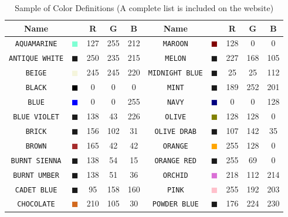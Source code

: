 \documentclass[11pt]{book}
\newcommand{\ct}{\tt\small}
\begin{document}
\begin{table}[p]
\begin{center}
\caption{Sample of Color Definitions (A complete list is included on the website) }
\label{tab:colors}
\vspace{0.1in}
\begin{tabular}{|c|c|c|c|c|c||c|c|c|c|}
\hline
Name & &  R  & G & B & Name & & R & G & B   \\ \hline \hline
{\ct AQUAMARINE} & \textcolor{AQUAMARINE} {$\blacksquare$} & 127& 255& 212& {\ct MAROON} &  \textcolor{MAROON} {$\blacksquare$} & 128& 0& 0  \\ \hline
{\ct ANTIQUE WHITE} & \textcolor{ANTIQUE WHITE} {$\blacksquare$} & 250& 235& 215& {\ct MELON} &  \textcolor{MELON} {$\blacksquare$} & 227& 168& 105  \\ \hline
{\ct BEIGE} & \textcolor{BEIGE} {$\blacksquare$} & 245& 245& 220& {\ct MIDNIGHT BLUE} &  \textcolor{MIDNIGHT BLUE} {$\blacksquare$} & 25& 25& 112  \\ \hline
{\ct BLACK} & \textcolor{BLACK} {$\blacksquare$} & 0& 0& 0& {\ct MINT} &  \textcolor{MINT} {$\blacksquare$} & 189& 252& 201  \\ \hline
{\ct BLUE} & \textcolor{BLUE} {$\blacksquare$} & 0& 0& 255& {\ct NAVY} &  \textcolor{NAVY} {$\blacksquare$} & 0& 0& 128  \\ \hline
{\ct BLUE VIOLET} & \textcolor{BLUE VIOLET} {$\blacksquare$} & 138& 43& 226& {\ct OLIVE} &  \textcolor{OLIVE} {$\blacksquare$} & 128& 128& 0  \\ \hline
{\ct BRICK} & \textcolor{BRICK} {$\blacksquare$} & 156& 102& 31& {\ct OLIVE DRAB} &  \textcolor{OLIVE DRAB} {$\blacksquare$} & 107& 142& 35  \\ \hline
{\ct BROWN} & \textcolor{BROWN} {$\blacksquare$} & 165& 42& 42& {\ct ORANGE} &  \textcolor{ORANGE} {$\blacksquare$} & 255& 128& 0  \\ \hline
{\ct BURNT SIENNA} & \textcolor{BURNT SIENNA} {$\blacksquare$} & 138& 54& 15& {\ct ORANGE RED} &  \textcolor{ORANGE RED} {$\blacksquare$} & 255& 69& 0  \\ \hline
{\ct BURNT UMBER} & \textcolor{BURNT UMBER} {$\blacksquare$} & 138& 51& 36& {\ct ORCHID} &  \textcolor{ORCHID} {$\blacksquare$} & 218& 112& 214  \\ \hline
{\ct CADET BLUE} & \textcolor{CADET BLUE} {$\blacksquare$} & 95& 158& 160& {\ct PINK} &  \textcolor{PINK} {$\blacksquare$} & 255& 192& 203  \\ \hline
{\ct CHOCOLATE} & \textcolor{CHOCOLATE} {$\blacksquare$} & 210& 105& 30& {\ct POWDER BLUE} &  \textcolor{POWDER BLUE} {$\blacksquare$} & 176& 224& 230  \\ \hline

\end{tabular}
\end{center}
\end{table}
\end{document}
